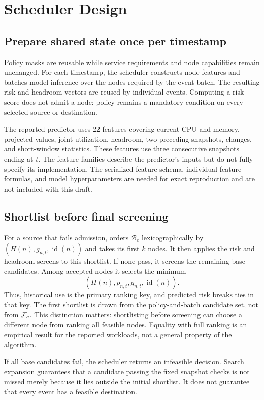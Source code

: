\section{Scheduler Design}\label{sec:method}
\subsection{Prepare shared state once per timestamp}
Policy masks are reusable while service requirements and node capabilities
remain unchanged. For each timestamp, the scheduler constructs node features
and batches model inference over the nodes required by the event batch.
The resulting risk and headroom vectors are reused by individual events.
Computing a risk score does not admit a node: policy remains a mandatory
condition on every selected source or destination.

The reported predictor uses 22 features covering current CPU and memory,
projected values, joint utilization, headroom, two preceding snapshots,
changes, and short-window statistics. These features use three consecutive
snapshots ending at $t$. The feature families describe the predictor's inputs but do not fully
specify its implementation. The serialized feature schema, individual
feature formulas, and model hyperparameters are needed for exact
reproduction and are not included with this draft.

\subsection{Shortlist before final screening}
For a source that fails admission, \cage orders $\mathcal B_e$
lexicographically by $(H(n),g_{n,t},\operatorname{id}(n))$ and takes its
first $k$ nodes. It then applies the risk and headroom screens to this
shortlist. If none pass, it screens the remaining base candidates.
Among accepted nodes it selects the minimum
\begin{equation}\label{eq:ranking}
\left(H(n),p_{n,t},g_{n,t},\operatorname{id}(n)\right).
\end{equation}
Thus, historical use is the primary ranking key, and predicted risk breaks
ties in that key. The first shortlist is drawn from the policy-and-batch
candidate set, not from $\mathcal{F}_e$. This distinction matters: shortlisting
before screening can choose a different node from ranking all feasible
nodes. Equality with full ranking is an empirical result for the reported
workloads, not a general property of the algorithm.

If all base candidates fail, the scheduler returns an infeasible decision.
Search expansion guarantees that a candidate passing the fixed snapshot
checks is not missed merely because it lies outside the initial shortlist.
It does not guarantee that every event has a feasible destination.


